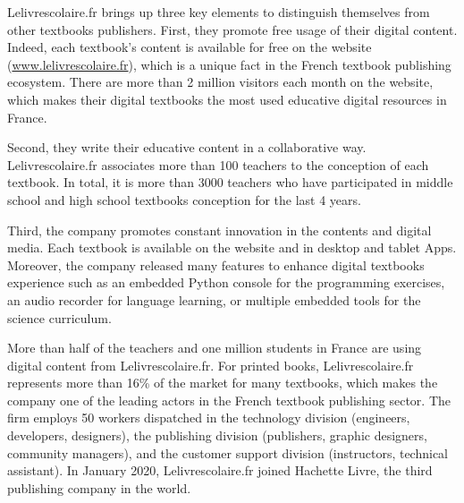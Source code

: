 Lelivrescolaire.fr brings up three key elements to distinguish themselves from other textbooks publishers. First, they promote free usage of their digital content. Indeed, each textbook's content is available for free on the website (\href{https://www.lelivrescolaire.fr}{www.lelivrescolaire.fr}), which is a unique fact in the French textbook publishing ecosystem. There are more than 2 million visitors each month on the website, which makes their digital textbooks the most used educative digital resources in France. 

Second, they write their educative content in a collaborative way. Lelivrescolaire.fr associates more than 100 teachers to the conception of each textbook. In total, it is more than 3000 teachers who have participated in middle school and high school textbooks conception for the last 4 years. 

Third, the company promotes constant innovation in the contents and digital media. Each textbook is available on the website and in desktop and tablet Apps. Moreover, the company released many features to enhance digital textbooks experience such as an embedded Python console for the programming exercises, an audio recorder for language learning, or multiple embedded tools for the science curriculum.  

More than half of the teachers and one million students in France are using digital content from Lelivrescolaire.fr. For printed books, Lelivrescolaire.fr represents more than 16\% of the market for many textbooks, which makes the company one of the leading actors in the French textbook publishing sector. The firm employs 50 workers dispatched in the technology division (engineers, developers, designers), the publishing division (publishers, graphic designers, community managers), and the customer support division (instructors, technical assistant). In January 2020, Lelivrescolaire.fr joined Hachette Livre, the third publishing company in the world.
